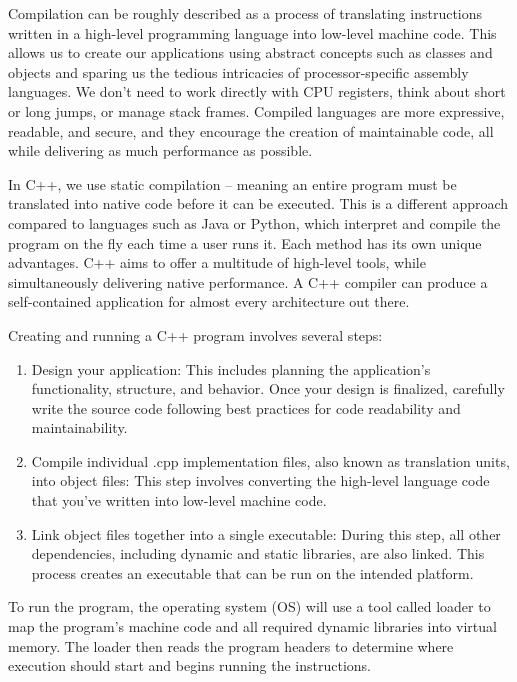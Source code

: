 
Compilation can be roughly described as a process of translating instructions written in a high-level programming language into low-level machine code. This allows us to create our applications using abstract concepts such as classes and objects and sparing us the tedious intricacies of processor-specific assembly languages. We don’t need to work directly with CPU registers, think about short or long jumps, or manage stack frames. Compiled languages are more expressive, readable, and secure, and they encourage the creation of maintainable code, all while delivering as much performance as possible.

In C++, we use static compilation – meaning an entire program must be translated into native code before it can be executed. This is a different approach compared to languages such as Java or Python, which interpret and compile the program on the fly each time a user runs it. Each method has its own unique advantages. C++ aims to offer a multitude of high-level tools, while simultaneously delivering native performance. A C++ compiler can produce a self-contained application for almost every architecture out there.

Creating and running a C++ program involves several steps:

\begin{enumerate}
\item
Design your application: This includes planning the application’s functionality, structure, and behavior. Once your design is finalized, carefully write the source code following best practices for code readability and maintainability.

\item
Compile individual .cpp implementation files, also known as translation units, into object files: This step involves converting the high-level language code that you’ve written into low-level machine code.

\item
Link object files together into a single executable: During this step, all other dependencies, including dynamic and static libraries, are also linked. This process creates an executable that can be run on the intended platform.
\end{enumerate}

To run the program, the operating system (OS) will use a tool called loader to map the program’s machine code and all required dynamic libraries into virtual memory. The loader then reads the program headers to determine where execution should start and begins running the instructions.


